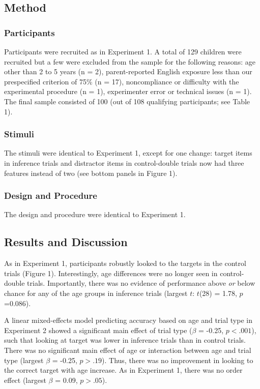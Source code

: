 \documentclass[a4paper,man,apacite,floatsintext]{apa6}
\begin{document}
\subsection{Method}\label{method-1}

\subsubsection{Participants}\label{participants-1}

Participants were recruited as in Experiment 1. A total of 129 children
were recruited but a few were excluded from the sample for the following
reasons: age other than 2 to 5 years (n = 2), parent-reported English
exposure less than our prespecified criterion of 75\% (n = 17),
noncompliance or difficulty with the experimental procedure (n = 1),
experimenter error or technical issues (n = 1). The final sample
consisted of 100 (out of 108 qualifying participants; see Table 1).

\subsubsection{Stimuli}\label{stimuli}

The stimuli were identical to Experiment 1, except for one change:
target items in inference trials and distractor items in control-double
trials now had three features instead of two (see bottom panels in
Figure 1).

\subsubsection{Design and Procedure}\label{design-and-procedure}

The design and procedure were identical to Experiment 1.

\subsection{Results and Discussion}\label{results-and-discussion-1}

As in Experiment 1, participants robustly looked to the targets in the
control trials (Figure 1). Interestingly, age differences were no longer
seen in control-double trials. Importantly, there was no evidence of
performance above \emph{or} below chance for any of the age groups in
inference trials (largest \(t\): \(t\)(28) = 1.78, \(p\) =0.086).

A linear mixed-effects model predicting accuracy based on age and trial
type in Experiment 2 showed a significant main effect of trial type
(\(\beta\) = -0.25, \(p <.001\)), such that looking at target was lower
in inference trials than in control trials. There was no significant
main effect of age or interaction between age and trial type (largest
\(\beta\) = -0.25, \(p >.19\)). Thus, there was no improvement in
looking to the correct target with age increase. As in Experiment 1,
there was no order effect (largest \(\beta\) = 0.09, \(p >.05\)).
\end{document}
